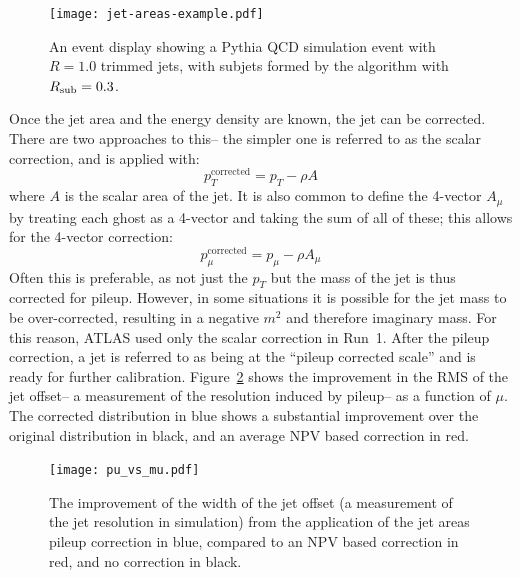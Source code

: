 
\begin{figure}
\centering
\texttt{[image: jet-areas-example.pdf]}
\label{fig:jet-reconstruction:jet-active-areas}
\caption{An event display showing a Pythia QCD simulation event with \antikt $R=1.0$ trimmed jets, with subjets formed by the \kt algorithm with $R_{\rm sub} = 0.3$.}
\end{figure}


Once the jet area and the energy density are known, the jet can be corrected. There are two approaches to this-- the simpler one is referred to as the scalar correction, and is applied with:
%
\begin{equation}
p_T^{\mathrm{corrected}} = p_T - \rho A
\end{equation}
%
where $A$ is the scalar area of the jet. It is also common to define the 4-vector $A_\mu$ by treating each ghost as a 4-vector and taking the sum of all of these; this allows for the 4-vector correction:
%
\begin{equation}
p_\mu^{\mathrm{corrected}} = p_\mu - \rho A_\mu
\end{equation}
%
Often this is preferable, as not just the $p_T$ but the mass of the jet is thus corrected for pileup. However, in some situations it is possible for the jet mass to be over-corrected, resulting in a negative $m^2$ and therefore imaginary mass. For this reason, ATLAS used only the scalar correction in Run~1. After the pileup correction, a jet is referred to as being at the ``pileup corrected scale'' and is ready for further calibration. Figure~\ref{fig:jet-reconstruction:jet-pu-vs-mu} shows the improvement in the RMS of the jet offset-- a measurement of the resolution induced by pileup-- as a function of $\mu$. The corrected distribution in blue shows a substantial improvement over the original distribution in black, and an average NPV based correction in red.


\begin{figure}
\centering
\texttt{[image: pu\_vs\_mu.pdf]}
\label{fig:jet-reconstruction:jet-pu-vs-mu}
\caption{The improvement of the width of the jet offset (a measurement of the jet resolution in simulation) from the application of the jet areas pileup correction in blue, compared to an NPV based correction in red, and no correction in black.}
\end{figure}


